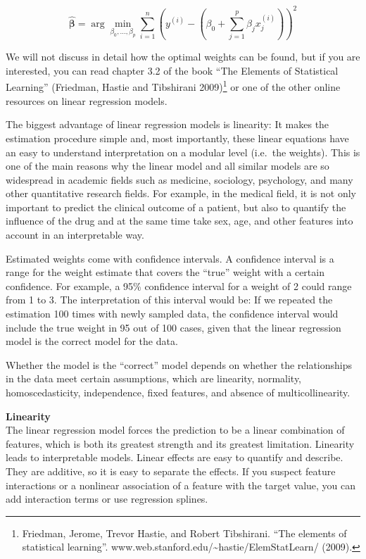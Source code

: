 \documentclass[
  12pt,
]{krantz}
\begin{document}
\[\hat{\boldsymbol{\beta}}=\arg\!\min_{\beta_0,\ldots,\beta_p}\sum_{i=1}^n\left(y^{(i)}-\left(\beta_0+\sum_{j=1}^p\beta_jx^{(i)}_{j}\right)\right)^{2}\]

We will not discuss in detail how the optimal weights can be found, but if you are interested, you can read chapter 3.2 of the book ``The Elements of Statistical Learning'' (Friedman, Hastie and Tibshirani 2009)\footnote{Friedman, Jerome, Trevor Hastie, and Robert Tibshirani. ``The elements of statistical learning''. www.web.stanford.edu/\textasciitilde hastie/ElemStatLearn/ (2009).} or one of the other online resources on linear regression models.

The biggest advantage of linear regression models is linearity:
It makes the estimation procedure simple and, most importantly, these linear equations have an easy to understand interpretation on a modular level (i.e.~the weights).
This is one of the main reasons why the linear model and all similar models are so widespread in academic fields such as medicine, sociology, psychology, and many other quantitative research fields.
For example, in the medical field, it is not only important to predict the clinical outcome of a patient, but also to quantify the influence of the drug and at the same time take sex, age, and other features into account in an interpretable way.

Estimated weights come with confidence intervals.
A confidence interval is a range for the weight estimate that covers the ``true'' weight with a certain confidence.
For example, a 95\% confidence interval for a weight of 2 could range from 1 to 3.
The interpretation of this interval would be:
If we repeated the estimation 100 times with newly sampled data, the confidence interval would include the true weight in 95 out of 100 cases, given that the linear regression model is the correct model for the data.

Whether the model is the ``correct'' model depends on whether the relationships in the data meet certain assumptions, which are linearity, normality, homoscedasticity, independence, fixed features, and absence of multicollinearity.

\textbf{Linearity}\\
The linear regression model forces the prediction to be a linear combination of features, which is both its greatest strength and its greatest limitation.
Linearity leads to interpretable models.
Linear effects are easy to quantify and describe.
They are additive, so it is easy to separate the effects.
If you suspect feature interactions or a nonlinear association of a feature with the target value, you can add interaction terms or use regression splines.
\end{document}
